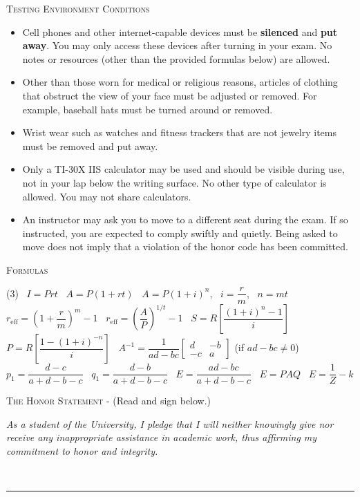 \noindent \textsc{Testing Environment Conditions}
\begin{small}
\begin{itemize}
\item Cell phones and other internet-capable devices must be \textbf{silenced} and \textbf{put away}. You may only access these devices after turning in your exam. No notes or resources (other than the provided formulas below) are allowed.
\item Other than those worn for medical or religious reasons, articles of clothing that obstruct the view of your face must be adjusted or removed. For example, baseball hats must be turned around or removed.
\item Wrist wear such as watches and fitness trackers that are not jewelry items must be removed and put away.
\item Only a TI-30X IIS calculator may be used and should be visible during use, not in your lap below the writing surface. No other type of calculator is allowed. You may not share calculators.
\item An instructor may ask you to move to a different seat during the exam. If so instructed, you are expected to comply swiftly and quietly. Being asked to move does not imply that a violation of the honor code has been committed.\\
\end{itemize}
\end{small}

\noindent \textsc{Formulas}

\begin{tasks}(3)
  \task[\textbf{A. }] \ \(I=Prt\)
  \task[\textbf{B. }] \ \(A=P(1+rt)\)
  \task[\textbf{C. }] \ \(A=P(1+i)^n\), \ \(i=\dfrac{r}{m}\), \ \(n=mt\)
  \task[\textbf{D. }] \ \(r_{\text{eff}}=\left(1+\dfrac{r}{m}\right)^m - 1\)
  \task[\textbf{E. }] \ \(r_{\text{eff}} = \left(\dfrac{A}{P}\right)^{1/t} - 1\)
  \task[\textbf{F. }] \ \(S = R\left[\dfrac{(1+i)^n-1}{i} \right]\)
  \task[\textbf{G. }] \ \(P = R\left[\dfrac{1-(1+i)^{-n}}{i} \right]\)
  \task[\textbf{H. }] \ \(A^{-1} = \dfrac{1}{ad-bc}\begin{bmatrix} d & -b \\ -c & a\end{bmatrix}\)
  \task[] \hspace{-.6in}(if \(ad-bc\not=0\))
  \task[\textbf{I. }] \ \(p_1 = \dfrac{d-c}{a+d-b-c}\)
  \task[\textbf{J. }] \ \(q_1 = \dfrac{d-b}{a+d-b-c}\)
  \task[\textbf{K. }] \ \(E = \dfrac{ad-bc}{a+d-b-c}\)
  \task[\textbf{L. }] \ \(E = PAQ\)
  \task[\textbf{M. }] \ \(E = \dfrac{1}{Z}-k\)
\end{tasks}

\bigskip

\noindent \textsc{The Honor Statement} - (Read and sign below.)\\
\begin{footnotesize}
\textit{As a student of the University, I pledge that I will neither knowingly give nor receive any inappropriate assistance in academic work, thus affirming my commitment to honor and integrity.}\\
\end{footnotesize}

 \ \rule{8.75 cm}{.01cm}\\
